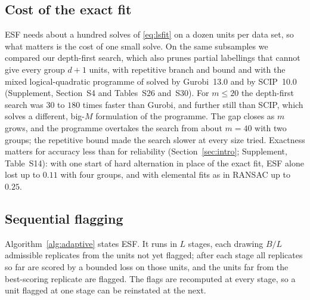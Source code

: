 \subsection{Cost of the exact fit}
\label{sec:solvers}

ESF needs about a hundred solves of \eqref{eq:lsfit} on a dozen units per data set, so what
matters is the cost of one small solve. On the same subsamples we compared our depth-first
search, which also prunes partial labellings that cannot give every group $d+1$ units, with
repetitive branch and bound \citep{brusco2006repetitive} and with the mixed logical-quadratic
programme of \citet{carbonneau2011globally} solved by Gurobi~13.0 \citep{gurobi2026} and by
SCIP~10.0 \citep{maher2016pyscipopt} (Supplement, Section~S4 and Tables~S26 and~S30). For
$m\le20$ the depth-first search was $30$ to $180$ times faster than Gurobi, and further still
than SCIP, which solves a different, big-$M$ formulation of the programme. The gap closes as
$m$ grows, and the programme overtakes the search from about $m=40$ with two groups; the
repetitive bound made the search slower at every size tried. Exactness matters for accuracy less
than for reliability (Section~\ref{sec:intro}; Supplement, Table~S14): with one start of hard
alternation in place of the exact fit, ESF alone lost up to $0.11$ with four groups, and with
elemental fits as in RANSAC up to $0.25$.

\subsection{Sequential flagging}
\label{sec:algorithm}

Algorithm~\ref{alg:adaptive} states ESF. It runs in $L$ stages, each drawing $B/L$ admissible
replicates from the units not yet flagged; after each stage all replicates so far are scored by
a bounded loss on those units, and the units far from the best-scoring replicate are flagged.
The flags are recomputed at every stage, so a unit flagged at one stage can be reinstated at
the next.

